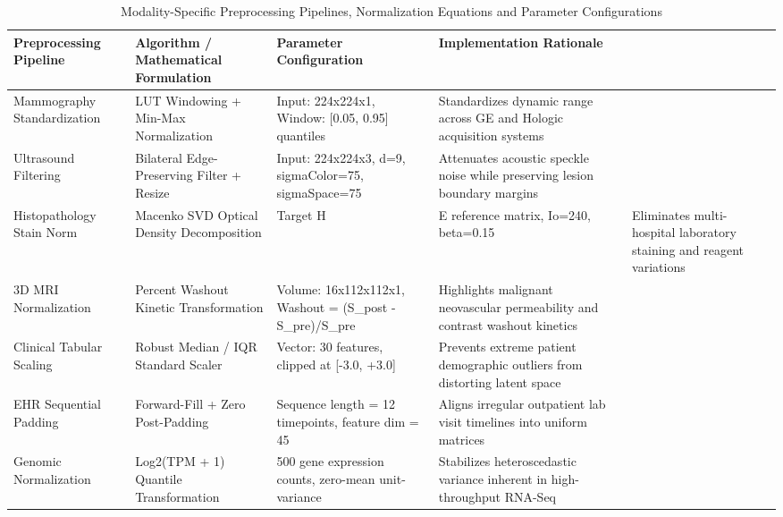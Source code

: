 \begin{table}
\caption{Modality-Specific Preprocessing Pipelines, Normalization Equations and Parameter Configurations}
\label{tab:supp_table_02_preprocessing_normalization_and_data_augmentation_parameters}
\begin{tabular}{llll}
\toprule
Preprocessing Pipeline & Algorithm / Mathematical Formulation & Parameter Configuration & Implementation Rationale \\
\midrule
Mammography Standardization & LUT Windowing + Min-Max Normalization & Input: 224x224x1, Window: [0.05, 0.95] quantiles & Standardizes dynamic range across GE and Hologic acquisition systems \\
Ultrasound Filtering & Bilateral Edge-Preserving Filter + Resize & Input: 224x224x3, d=9, sigmaColor=75, sigmaSpace=75 & Attenuates acoustic speckle noise while preserving lesion boundary margins \\
Histopathology Stain Norm & Macenko SVD Optical Density Decomposition & Target H&E reference matrix, Io=240, beta=0.15 & Eliminates multi-hospital laboratory staining and reagent variations \\
3D MRI Normalization & Percent Washout Kinetic Transformation & Volume: 16x112x112x1, Washout = (S_post - S_pre)/S_pre & Highlights malignant neovascular permeability and contrast washout kinetics \\
Clinical Tabular Scaling & Robust Median / IQR Standard Scaler & Vector: 30 features, clipped at [-3.0, +3.0] & Prevents extreme patient demographic outliers from distorting latent space \\
EHR Sequential Padding & Forward-Fill + Zero Post-Padding & Sequence length = 12 timepoints, feature dim = 45 & Aligns irregular outpatient lab visit timelines into uniform matrices \\
Genomic Normalization & Log2(TPM + 1) Quantile Transformation & 500 gene expression counts, zero-mean unit-variance & Stabilizes heteroscedastic variance inherent in high-throughput RNA-Seq \\
\bottomrule
\end{tabular}
\end{table}
